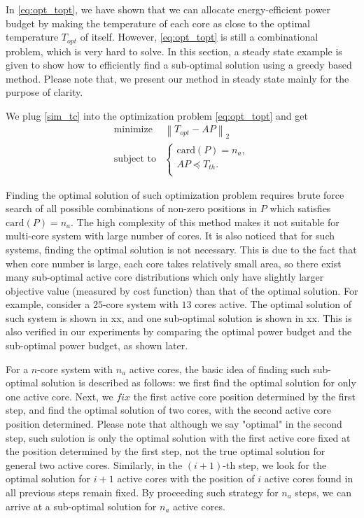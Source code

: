 In \eqref{eq:opt_topt}, we have shown that we can allocate energy-efficient power budget by making the temperature of each core as close to the optimal temperature $T_{opt}$ of itself. However, \eqref{eq:opt_topt} is still a combinational problem, which is very hard to solve. In this section, a steady state example is given to show how to efficiently find a sub-optimal solution using a greedy based method. Please note that, we present our method in steady state mainly for the purpose of clarity.

We plug \eqref{sim_tc} into the optimization problem \eqref{eq:opt_topt} and get
\begin{equation}\label{eq:sim_opt_topt}
\begin{split}
\text{minimize } &  \left \| T_{opt} - AP \right \|_{2}\\
\text{subject to} &\left\{
\begin{array}{lr}
\text{card}(P) = n_{a},\\
AP \preceq T_{th}.\\
\end{array}
\right.
\end{split}
\end{equation}

Finding the optimal solution of such optimization problem requires brute force search of all possible combinations of non-zero positions in $P$ which satisfies $\text{card}(P)=n_{a}$. The high complexity of this method makes it not suitable for multi-core system with large number of cores. It is also noticed that for such systems, finding the optimal solution is not necessary. This is due to the fact that when core number is large, each core takes relatively small area, so there exist many sub-optimal active core distributions which only have slightly larger objective value (measured by cost function) than that of the optimal solution. For example, consider a $25$-core system with $13$ cores active. The optimal solution of such system is shown in xx, and one sub-optimal solution is shown in xx. This is also verified in our experiments by comparing the optimal power budget and the sub-optimal power budget, as shown later.

For a $n$-core system with $n_{a}$ active cores, the basic idea of finding such sub-optimal solution is described as follows: we first find the optimal solution for only one active core. Next, we $fix$ the first active core position determined by the first step, and find the optimal solution of two cores, with the second active core position determined. Please note that although we say "optimal" in the second step, such sulotion is only the optimal solution with the first active core fixed at the position determined by the first step, not the true optimal solution for general two active cores. Similarly, in the $(i+1)$-th step, we look for the optimal solution for $i+1$ active cores with the position of $i$ active cores found in all previous steps remain fixed. By proceeding such strategy for $n_{a}$ steps, we can arrive at a sub-optimal solution for $n_{a}$ active cores.



